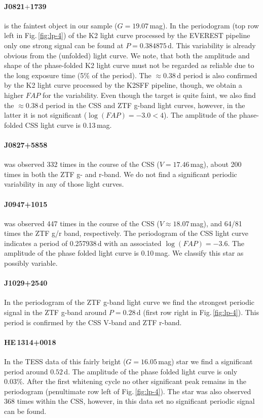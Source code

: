 \documentclass{aa}
\newcommand{\fg}[1]{\mbox{Fig.\,\ref{#1}}}
\begin{document}
\paragraph{J0821$+$1739} is the faintest object in our sample ($G=19.07$\,mag).
In the periodogram (top row left in \fg{fig:lp-4}) of the K2 light curve processed
by the EVEREST pipeline only one strong signal can be found at $P=0.384875$\,d.
This variability is already obvious from the (unfolded)
light curve. We note, that both the
amplitude and shape of the phase-folded K2 light curve must not be regarded as
reliable due to the long exposure time (5\% of the period). The
$\approx 0.38$\,d period is also confirmed by the K2 light curve processed by
the K2SFF pipeline, though, we obtain a higher $FAP$ for
the variability. Even though the target is quite faint, we also find the
$\approx 0.38$\,d period in the CSS and ZTF g-band light curves, however, in
the latter it is not significant ($\log(FAP)=-3.0<4$). The amplitude of the
phase-folded CSS light curve is 0.13\,mag.
\paragraph{J0827+5858} was observed 332 times in the course of the CSS
($V=17.46$\,mag), about 200 times in both the ZTF g- and r-band. We do
not find a significant periodic variability in any of those light curves.
\paragraph{J0947+1015} was observed 447 times in the course of the CSS
($V\approx18.07$\,mag), and 64/81 times the ZTF g/r band, respectively. The
periodogram of the CSS light curve indicates a period of 0.257938\,d
with an associated $\log(FAP)=-3.6$. The amplitude of the phase folded light
curve is 0.10\,mag. We classify this star as possibly variable.
\paragraph{J1029+2540}
In the periodogram of the ZTF g-band light curve we find the strongest periodic
signal in the ZTF g-band around $P=0.28$\,d (first row right in
\fg{fig:lp-4}). This period is confirmed by the  CSS V-band and ZTF r-band.
\paragraph{HE\,1314+0018} In the TESS data of this fairly bright ($G=16.05$\,mag)
star we find a significant period around $0.52$\,d. The
amplitude of the phase folded light curve is only 0.03\%. After the first
whitening cycle no other significant peak remains in the periodogram (penultimate row
left of \fg{fig:lp-4}). The star was also observed 368 times within the CSS,
however, in this data set no significant periodic signal can be found.
\end{document}
